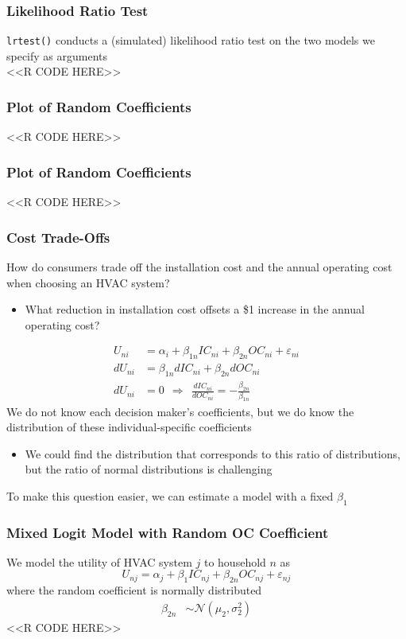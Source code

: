 \documentclass{beamer}
\begin{document}
\begin{frame}[fragile]\frametitle{Likelihood Ratio Test}
    \texttt{lrtest()} conducts a (simulated) likelihood ratio test on the two models we specify as arguments \\
    <<R CODE HERE>>
\end{frame}

\begin{frame}[fragile]\frametitle{Plot of Random Coefficients}
    <<R CODE HERE>>
\end{frame}

\begin{frame}[fragile]\frametitle{Plot of Random Coefficients}
    <<R CODE HERE>>
\end{frame}

\begin{frame}\frametitle{Cost Trade-Offs}
    How do consumers trade off the installation cost and the annual operating cost when choosing an HVAC system?
    \begin{itemize}
        \item What reduction in installation cost offsets a \$1 increase in the annual operating cost?
    \end{itemize}
    \begin{align*}
        U_{ni} & = \alpha_i + \beta_{1n} IC_{ni} + \beta_{2n} OC_{ni} + \varepsilon_{ni} \\
        dU_{ni} & = \beta_{1n} dIC_{ni} + \beta_{2n} dOC_{ni} \\
        dU_{ni} & = 0 ~~ \Rightarrow ~~ \frac{dIC_{ni}}{dOC_{ni}} = -\frac{\beta_{2n}}{\beta_{1n}}
    \end{align*}
    We do not know each decision maker's coefficients, but we do know the distribution of these individual-specific coefficients
    \begin{itemize}
    	\item We could find the distribution that corresponds to this ratio of distributions, but the ratio of normal distributions is challenging
    \end{itemize}
    \vspace{2ex}
    To make this question easier, we can estimate a model with a fixed $\beta_1$
\end{frame}

\begin{frame}[fragile]\frametitle{Mixed Logit Model with Random OC Coefficient}
    We model the utility of HVAC system $j$ to household $n$ as
    $$U_{nj} = \alpha_j + \beta_1 IC_{nj} + \beta_{2n} OC_{nj} + \varepsilon_{nj}$$
	where the random coefficient is normally distributed
	\begin{align*}
		\beta_{2n} & \sim \mathcal{N}(\mu_2, \sigma_2^2)
	\end{align*}
    <<R CODE HERE>>
\end{frame}
\end{document}
